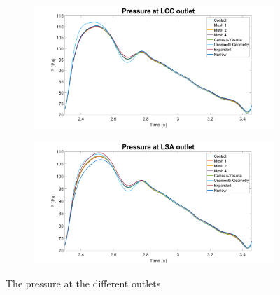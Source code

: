\begin{figure}
     \hfill
     \begin{subfigure}[b]{0.49\textwidth}
         \centering
         \includegraphics[width=\textwidth]{Figures/PLCC.png}
     \end{subfigure}
     \hfill
     \begin{subfigure}[b]{0.49\textwidth}
         \centering
         \includegraphics[width=\textwidth]{Figures/PLSA.png}
     \end{subfigure}
        \caption{The pressure at the different outlets}
        \label{fig:pressure}
\end{figure}

